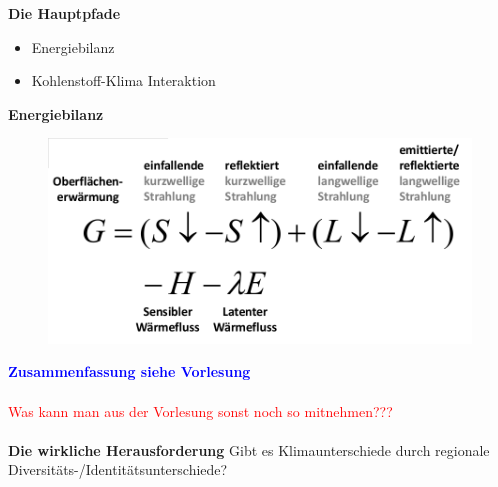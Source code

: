 \textbf{Die Hauptpfade}
\begin{itemize}
	\item Energiebilanz
	\item Kohlenstoff-Klima Interaktion
\end{itemize}

\textbf{Energiebilanz}\\
\begin{figure}[htp]
\centering
\includegraphics[scale=0.5]{lectures/DS10/pix/energybalance.png}
\caption{}
\label{}
\end{figure}

\textcolor{blue}{\textbf{Zusammenfassung siehe Vorlesung}}
\\\\
\textcolor{red}{Was kann man aus der Vorlesung sonst noch so mitnehmen???}
\\\\
\textbf{Die wirkliche Herausforderung} Gibt es Klimaunterschiede durch regionale Diversitäts-/Identitätsunterschiede?